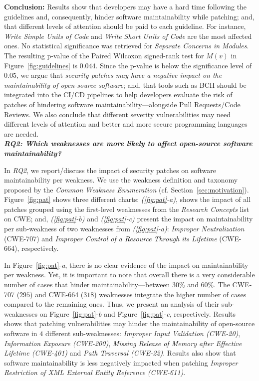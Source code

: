 \documentclass[10pt,conference]{IEEEtran}
\begin{document}
\textbf{Conclusion:} Results show that developers may have a hard time following the guidelines and, consequently, hinder software maintainability while patching; and, 
that different levels of attention should be paid to each guideline. For instance,
\emph{Write Simple Units of Code} and \emph{Write Short Units of Code}
are the most affected ones. No statistical significance was retrieved
for \emph{Separate Concerns in Modules}. 
The resulting p-value of the Paired Wilcoxon signed-rank test for $M(v)$ in Figure~\ref{fig:guidelines}
is $0.044$. Since the p-value is 
below the significance level of $0.05$, we argue that \emph{security patches 
may have a negative impact on the maintainability of open-source software}; and, 
that tools such as BCH should be integrated into the CI/CD pipelines
to help developers evaluate the risk of patches of hindering software maintainability---alongside Pull Requests/Code Reviews. We also conclude that different severity 
vulnerabilities may need different levels of attention and better and more secure 
programming languages are needed.
%
\\\textit{\textbf{RQ2: Which weaknesses are more likely to
affect open-source software maintainability?}}

In \emph{RQ2}, we report/discuss the impact of security patches on
software maintainability per weakness. We use the weakness definition
and taxonomy proposed by the \emph{Common Weakness Enumeration} (cf. Section~\ref{sec:motivation}).
Figure~\ref{fig:pat} shows three different charts: \emph{(\ref{fig:pat}-a)}, shows
the impact of all patches grouped using the first-level weaknesses from
the \emph{Research Concepts} list on CWE; and, \emph{(\ref{fig:pat}-b)} and  
\emph{(\ref{fig:pat}-c)} present the impact on maintainability per sub-weakness of two 
weaknesses from \emph{(\ref{fig:pat}-a)}: \emph{Improper Neutralization} (CWE-707) and 
\emph{Improper Control of a Resource 
Through its Lifetime} (CWE-664), respectively.

In Figure~\ref{fig:pat}-\emph{a}, there is no clear evidence of the impact on 
maintainability per weakness. Yet, it is important to note that
overall there is a very considerable number of cases that hinder
maintainability---between $30\%$ and $60\%$.
The CWE-707 ($295$) and CWE-664 ($318$) 
weaknesses integrate the higher number of cases compared to the remaining 
ones. Thus, we present an analysis of their sub-weaknesses on 
Figure~\ref{fig:pat}-\emph{b} and Figure~\ref{fig:pat}-\emph{c}, respectively. 
Results shows that patching vulnerabilities may hinder 
the maintainability of open-source software in $4$ different sub-weaknesses: 
\emph{Improper Input Validation (CWE-20)}, \emph{Information Exposure 
(CWE-200)}, \emph{Missing Release of Memory after Effective 
Lifetime (CWE-401)} and \emph{Path Traversal (CWE-22)}. Results also show that 
software maintainability is less negatively impacted when patching 
\emph{Improper Restriction of XML External Entity Reference (CWE-611)}.  
\end{document}
